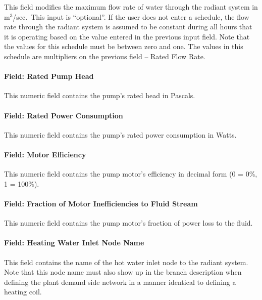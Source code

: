 This field modifies the maximum flow rate of water through the radiant system in m\(^{3}\)/sec.~This input is ``optional''. If the user does not enter a schedule, the flow rate through the radiant system is assumed to be constant during all hours that it is operating based on the value entered in the previous input field. Note that the values for this schedule must be between zero and one. The values in this schedule are multipliers on the previous field -- Rated Flow Rate.

\paragraph{Field: Rated Pump Head}\label{field-rated-pump-head}

This numeric field contains the pump's rated head in Pascals.

\paragraph{Field: Rated Power Consumption}\label{field-rated-power-consumption-000}

This numeric field contains the pump's rated power consumption in Watts.

\paragraph{Field: Motor Efficiency}\label{field-motor-efficiency-001}

This numeric field contains the pump motor's efficiency in decimal form (0 = 0\%, 1 = 100\%).

\paragraph{Field: Fraction of Motor Inefficiencies to Fluid Stream}\label{field-fraction-of-motor-inefficiencies-to-fluid-stream-000}

This numeric field contains the pump motor's fraction of power loss to the fluid.

\paragraph{Field: Heating Water Inlet Node Name}\label{field-heating-water-inlet-node-name-1}

This field contains the name of the hot water inlet node to the radiant system. Note that this node name must also show up in the branch description when defining the plant demand side network in a manner identical to defining a heating coil.

